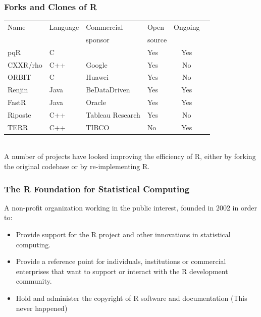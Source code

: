 \documentclass[svgnames]{beamer}
\begin{document}
\begin{frame}
  \frametitle{Forks and Clones of R}

  \begin{center}
  \begin{tabular}{llllcr}
    \hline
    Name & Language       & Commercial & Open   & Ongoing\\
         &                & sponsor    & source & \\
    \hline
    pqR     & C           &            & Yes    & Yes \\
    CXXR/rho  & C++       & Google     & Yes    & No\\
    ORBIT   & C           & Huawei     & Yes    & No\\
    \hline
    Renjin  & Java        & BeDataDriven & Yes  & Yes \\
    FastR   & Java        & Oracle     & Yes    & Yes \\
    Riposte & C++         & Tableau Research & Yes & No \\
    TERR    & C++         & TIBCO      & No     & Yes\\
    \hline
  \end{tabular}

  ~\\
  
  {\small A number of projects have looked improving the efficiency of
    R, either by forking the original codebase or by re-implementing
    R.}
  
  \end{center}
  
\end{frame}

\begin{frame}
  \frametitle{The R Foundation for Statistical Computing}

  A non-profit organization working in the public interest, founded
  in 2002 in order to:
  \begin{itemize}
  \item Provide support for the R project and other innovations in
    statistical computing.
  \item Provide a reference point for individuals, institutions or
    commercial enterprises that want to support or interact with the R
    development community.
  \item Hold and administer the copyright of R software and
    documentation (This never happened)
  \end{itemize}
  
\end{frame}
    
\end{document}

